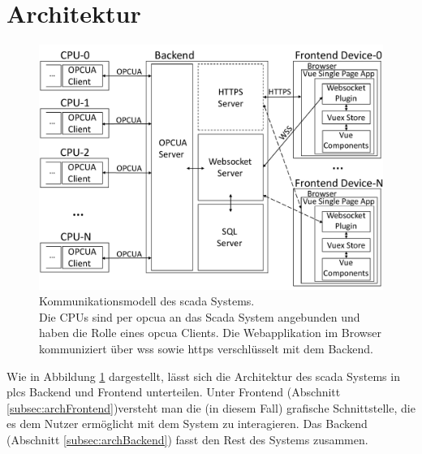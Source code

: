 \section{Architektur}

\begin{figure}[ht]
		\centering
		\includegraphics[width=\textwidth]{content/hauptteil/systemEntwurf/res/comMod.pdf}
    \caption[Kommunikationsmodell des \acs{scada} Systems]{Kommunikationsmodell des \acs{scada} Systems.\\
      Die CPUs sind per \acs{opcua} an das Scada System angebunden und haben die Rolle eines \acs{opcua} Clients.
      Die Webapplikation im Browser kommuniziert über \acs{wss} sowie \acs{https} verschlüsselt mit dem Backend.}
		\label{img:comMod}
\end{figure}
Wie in Abbildung \ref{img:comMod} dargestellt, lässt sich die Architektur des \ac{scada} Systems in \acp{plc} Backend und Frontend unterteilen.
Unter Frontend (Abschnitt \ref{subsec:archFrontend})versteht man die (in diesem Fall) grafische Schnittstelle, 
die es dem Nutzer ermöglicht mit dem System zu interagieren.
Das Backend (Abschnitt \ref{subsec:archBackend}) fasst den Rest des Systems zusammen.
